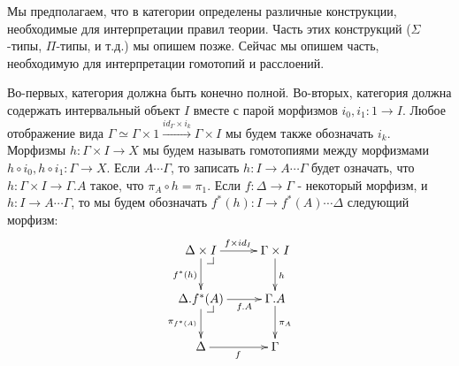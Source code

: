 \documentclass{amsart}
\makeatletter
\theoremstyle{definition}
\theoremstyle{remark}
\newcommand{\pb}[1][dr]{\save*!/#1-1.2pc/#1:(-1,1)@^{|-}\restore}
\newcommand{\po}[1][dr]{\save*!/#1+1.2pc/#1:(1,-1)@^{|-}\restore}
\numberwithin{figure}{section}
\makeatother
\begin{document}
Мы предполагаем, что в категории определены различные конструкции, необходимые для интерпретации правил теории.
Часть этих конструкций ($\Sigma$-типы, $\Pi$-типы, и т.д.) мы опишем позже.
Сейчас мы опишем часть, необходимую для интерпретации гомотопий и расслоений.

Во-первых, категория должна быть конечно полной.
Во-вторых, категория должна содержать интервальный объект $I$ вместе с парой морфизмов $i_0, i_1 : 1 \to I$.
Любое отображение вида $\Gamma \simeq \Gamma \times 1 \xrightarrow{id_\Gamma \times i_k} \Gamma \times I$ мы будем также обозначать $i_k$.
Морфизмы $h : \Gamma \times I \to X$ мы будем называть гомотопиями между морфизмами $h \circ i_0, h \circ i_1 : \Gamma \to X$.
Если $A \dotsb \Gamma$, то записать $h : I \to A \dotsb \Gamma$ будет означать, что $h : \Gamma \times I \to \Gamma.A$ такое, что $\pi_A \circ h = \pi_1$.
Если $f : \Delta \to \Gamma$ - некоторый морфизм, и $h : I \to A \dotsb \Gamma$, то мы будем обозначать $f^*(h) : I \to f^*(A) \dotsb \Delta$ следующий морфизм:
\[ \xymatrix{ \Delta \times I \ar[r]^{f \times id_I} \ar[d]_{f^*(h)} \pb & \Gamma \times I \ar[d]^h \\
              \Delta.f^*(A) \ar[r]_-{f.A} \ar[d]_{\pi_{f^*(A)}} \pb      & \Gamma.A \ar[d]^{\pi_A} \\
              \Delta \ar[r]_f                                            & \Gamma
                 }\]

\begin{comment}
Также в категории должен быть выбран насыщенный класс морфизмов, которые мы называем \emph{тривиальными корасслоениями}.
Морфизмы, которые имеют правое свойство поднятия по отношению к тривиальным корасслоениям, мы называем \emph{расслоениями}.
Мы требуем, чтобы для любого $A \dotsb \Gamma$ морфизмы $\pi_A : \Gamma.A \to \Gamma$ являлись расслоениями.

Тривиальные корасслоения должны содержать морфизмы вида $i_0 : \Gamma \to \Gamma \times I$ и
    $(\Gamma \times I \amalg \Gamma \times I) \amalg_{\Gamma \amalg \Gamma} \Gamma \times I \to \Gamma \times I \times I$, которые определяются как в следующей диаграмме:
\[ \xymatrix@-1pc{ \Gamma \amalg \Gamma \ar[rr]^{i_0 \amalg i_0} \ar[dd]_{[i_0, i_1]} & & \Gamma \times I \amalg \Gamma \times I \ar[dd] \ar[rddd]^{[i_0, i_1]} \\ \\
                   \Gamma \times I \ar[rr] \ar[rrrd]_{i_0 \times id_I} & & \po (\Gamma \times I \amalg \Gamma \times I) \amalg_{\Gamma \amalg \Gamma} \Gamma \times I \ar@{-->}[rd] \\
                                                                       & & & \Gamma \times I \times I
                 } \]
\end{comment}
\end{document}
